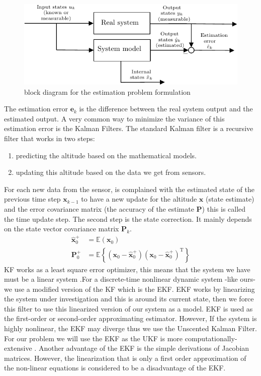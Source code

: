 \begin{figure}[H]
    \centering
    \includegraphics{Figures/estimation.pdf}
    \caption{block diagram for the estimation problem formulation}
    \label{fig:est}
\end{figure}
The estimation error $\mathbf{e}_k$ is the difference between the real system output and the estimated output. A very common way to minimize the variance of this estimation error is the Kalman Filters. The standard Kalman filter is a recursive filter that works in two steps:
\begin{enumerate}
    \item predicting the altitude based on the mathematical models.
    \item updating this altitude based on the data we get from sensors.
\end{enumerate}
For each new data from the sensor, is complained with the estimated state of the previous time step $\mathbf{x}_{k-1}$ to have a new update for the altitude $\mathbf{x}$ (state estimate) and the error covariance matrix (the accuracy of the estimate $\mathbf{P}$) this is called the time update step. The second step is the state correction. It mainly depends on the state vector covariance matrix $\mathbf{P}_{k}$.
\begin{align}
    \mathbf{\hat{x}}_{0}^{+} &= \mathbb{E}(\mathbf{x}_0)\\
    \mathbf{P}_{0}^{+} &= \mathbb{E} \left \{(\mathbf{x}_0 - \mathbf{\hat{x}}_0^{+}) (\mathbf{x}_0 - \mathbf{\hat{x}}_0^{+})^{\text{T}} \right \}
\end{align}
KF works as a least square error optimizer, this means that the system we have must be a linear system \cite{hasan2006review}.For a discrete-time nonlinear dynamic system -like ours- we use a modified version of the KF which is the EKF. EKF works by linearizing the system under investigation and this is around its current state, then we force this filter to use this linearized version of our system as a model. EKF is used as the first-order or second-order approximating estimator. However, If the system is highly nonlinear, the EKF may diverge thus we use the Unscented Kalman Filter. For our problem we will use the EKF as the UKF is more computationally-extensive \cite{fujii2013extended}. Another advantage of the EKF is the simple derivations of Jacobian matrices. However, the linearization that is only a first order approximation of the non-linear equations is considered to be a disadvantage of the EKF. 

